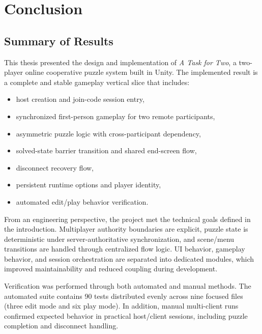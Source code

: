 ﻿\chapter{Conclusion}

\section{Summary of Results}
This thesis presented the design and implementation of \textit{A Task for Two}, a two-player online cooperative puzzle system built in Unity. The implemented result is a complete and stable gameplay vertical slice that includes:
\begin{itemize}
\item host creation and join-code session entry,
\item synchronized first-person gameplay for two remote participants,
\item asymmetric puzzle logic with cross-participant dependency,
\item solved-state barrier transition and shared end-screen flow,
\item disconnect recovery flow,
\item persistent runtime options and player identity,
\item automated edit/play behavior verification.
\end{itemize}

From an engineering perspective, the project met the technical goals defined in the introduction. Multiplayer authority boundaries are explicit, puzzle state is deterministic under server-authoritative synchronization, and scene/menu transitions are handled through centralized flow logic. UI behavior, gameplay behavior, and session orchestration are separated into dedicated modules, which improved maintainability and reduced coupling during development.

Verification was performed through both automated and manual methods. The automated suite contains 90 tests distributed evenly across nine focused files (three edit mode and six play mode). In addition, manual multi-client runs confirmed expected behavior in practical host/client sessions, including puzzle completion and disconnect handling.


